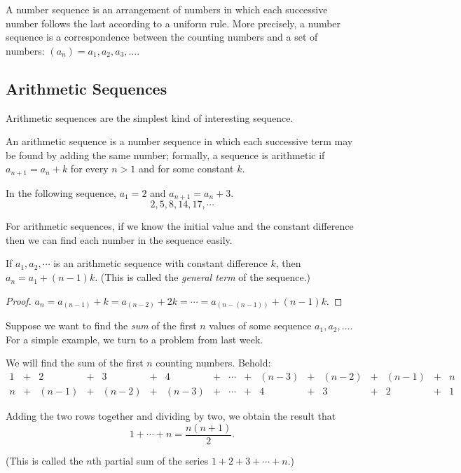 



A number sequence is an arrangement of numbers in which each successive number follows the last according to
a uniform rule. More precisely, a number sequence is a correspondence between the counting numbers and a set
of numbers: $ (a_n) = a_1, a_2, a_3, \dots $.

\subsection*{Arithmetic Sequences}
Arithmetic sequences are the simplest kind of interesting sequence.
\begin{defn}
  An arithmetic sequence is a number sequence in which each successive term may be found by adding the
  same number; formally, a sequence is arithmetic if $ a_{n + 1} = a_n + k $ for every $ n > 1 $ and for
  some constant $ k $.
\end{defn}
\begin{ex}
  In the following sequence, $ a_1 = 2 $ and $ a_{n + 1} = a_n + 3 $.
  \begin{displaymath}
    2, 5, 8, 14, 17, \cdots
  \end{displaymath}
\end{ex}

For arithmetic sequences, if we know the initial value and the constant difference then we can find each number
in the sequence easily.

\begin{thm}
  If $ a_1, a_2, \cdots $ is an arithmetic sequence with constant difference $ k $, then $ a_n = a_1 + (n - 1)k $.
  (This is called the \emph{general term} of the sequence.)
\end{thm}
\begin{proof}
  $ a_n = a_{(n - 1)} + k = a_{(n - 2)} + 2k = \cdots = a_{(n - (n - 1))} + (n - 1)k $.
\end{proof}

Suppose we want to find the \emph{sum} of the first $ n $ values of some sequence $ a_1, a_2, \dots $. For a simple
example, we turn to a problem from last week.
\begin{ex}
  We will find the sum of the first $ n $ counting numbers. Behold:
  \begin{displaymath}
    \begin{array}{ccccccccccccccccc}
    1 &+& 2 &+& 3 &+& 4 &+& \cdots &+& (n - 3) &+& (n - 2) &+& (n - 1) &+& n\\
    n &+& (n - 1) &+& (n - 2) &+& (n - 3) &+& \cdots &+& 4 &+& 3 &+& 2 &+& 1
    \end{array}
  \end{displaymath}

  Adding the two rows together and dividing by two, we obtain the result that
  \begin{displaymath}
    1 + \cdots + n = \frac{n(n + 1)}{2}.
  \end{displaymath}

  (This is called the $ n$th partial sum of the series $ 1 + 2 + 3 + \cdots + n $.)
\end{ex}

